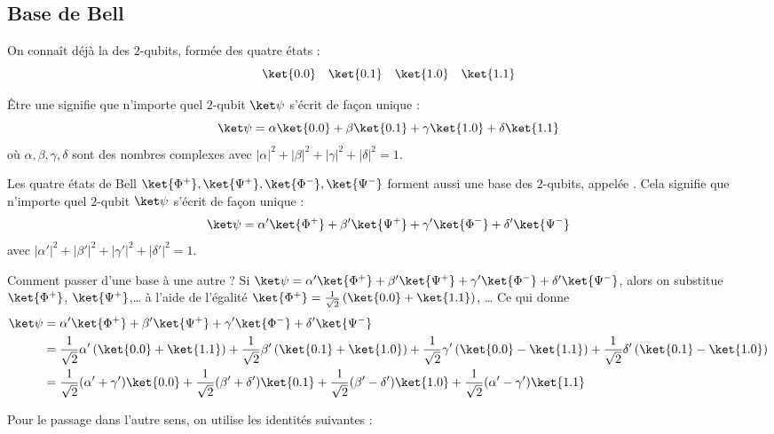 \documentclass[11pt,class=report,crop=false]{standalone}
\begin{document}
\subsection{Base de Bell}

On connaît déjà la  des $2$-qubits, formée des quatre états :
$$\ket{0.0}\quad\ket{0.1}\quad\ket{1.0}\quad\ket{1.1}$$

Être une  signifie que n'importe quel $2$-qubit $\ket\psi$ s'écrit de façon unique :
$$\ket\psi = \alpha\ket{0.0} + \beta\ket{0.1} + \gamma\ket{1.0} + \delta\ket{1.1}$$
où $\alpha,\beta,\gamma,\delta$ sont des nombres complexes avec $|\alpha|^2 + |\beta|^2 + |\gamma|^2 + |\delta|^2 = 1$.

\begin{proposition}
Les quatre états de Bell $\ket{\Phi^+}, 
\ket{\Psi^+},
\ket{\Phi^-},
\ket{\Psi^-}$
forment aussi une base des $2$-qubits, appelée .
Cela signifie que n'importe quel $2$-qubit $\ket\psi$ s'écrit de façon unique :
$$\ket\psi = \alpha'\ket{\Phi^+} + \beta'\ket{\Psi^+} + \gamma'\ket{\Phi^-} + \delta'\ket{\Psi^-}$$
avec $|\alpha'|^2 + |\beta'|^2 + |\gamma'|^2 + |\delta'|^2 = 1$.
\end{proposition}

\bigskip

Comment passer d'une base à une autre ?
Si $\ket\psi = \alpha'\ket{\Phi^+} + \beta'\ket{\Psi^+} + \gamma'\ket{\Phi^-} + \delta'\ket{\Psi^-}$,
alors on substitue $\ket{\Phi^+}$, $\ket{\Psi^+}$,\ldots{} à l'aide de l'égalité $\ket{\Phi^+} = \frac1{\sqrt2}\left(\ket{0.0}+\ket{1.1}\right)$, \ldots{}
Ce qui donne 
\begin{align*}
\ket\psi 
&= \alpha'\ket{\Phi^+} + \beta'\ket{\Psi^+} + \gamma'\ket{\Phi^-} + \delta'\ket{\Psi^-} \\
&= \frac1{\sqrt2}\alpha'\left(\ket{0.0}+\ket{1.1}\right) 
+ \frac1{\sqrt2}\beta'\left(\ket{0.1}+\ket{1.0}\right) 
+ \frac1{\sqrt2}\gamma'\left(\ket{0.0}-\ket{1.1}\right) 
+ \frac1{\sqrt2}\delta'\left(\ket{0.1}-\ket{1.0}\right) \\
&= \frac1{\sqrt2}(\alpha'+\gamma')\ket{0.0}
+ \frac1{\sqrt2}(\beta'+\delta')\ket{0.1}
+ \frac1{\sqrt2}(\beta'-\delta')\ket{1.0}
+ \frac1{\sqrt2}(\alpha'-\gamma')\ket{1.1} \\
\end{align*}

Pour le passage dans l'autre sens, on utilise les identités suivantes :
\end{document}
